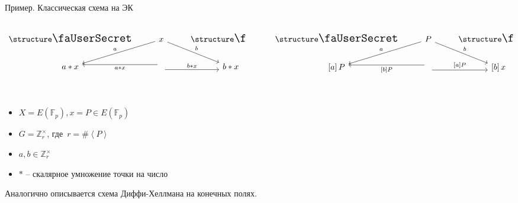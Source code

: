 \documentclass{beamer}
\begin{document}
\begin{frame}[fragile]{Пример. Классическая схема на ЭК}
	\begin{columns}
		\begin{column}{0.45\textwidth}
			\[
			\begin{tikzcd}
				\text{\UserA} &\arrow{ld}[swap]{a} x  \arrow{rd}{b} & \text{\UserB} \\
				a * x &
				\arrow[yshift=-0.7ex]{r}{b * x}
				\arrow[yshift=0.7ex]{l}{a * x}
				& b * x\\
			\end{tikzcd}
			\]
		\end{column}
		\begin{column}{0.1\textwidth}
			\structure{$\Rightarrow$}
		\end{column}
		\begin{column}{0.45\textwidth}
				\[
			\begin{tikzcd}
				\text{\UserA} &\arrow{ld}[swap]{a} P \arrow{rd}{b} & \text{\UserB} \\
				\left[a\right] P &
				\arrow[yshift=-0.7ex]{r}{\left[a\right] P}
				\arrow[yshift=0.7ex]{l}{\left[b\right] P}
				& \left[ b \right] x\\
			\end{tikzcd}
			\]
		\end{column}
	\end{columns}
	\vspace{-0.5em}
	\begin{itemize}
		\item $X = E(\mathbb{F}_p), x = P \in E(\mathbb{F}_p)$
		\item $G = \mathbb{Z}_r^\times$, где~$r = \#\left<P\right>$
		\item $a, b \in \mathbb{Z}_r^\times$
		\item $*$ -- скалярное умножение точки на число
	\end{itemize}
	
	\vspace{0.5em}
	Аналогично описывается схема Диффи-Хеллмана на конечных полях.
\end{frame}
\end{document}
